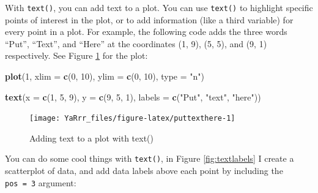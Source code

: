 \documentclass[]{book}
\newenvironment{Shaded}{\begin{snugshade}}{\end{snugshade}}
\newcommand{\KeywordTok}[1]{\textcolor[rgb]{0.13,0.29,0.53}{\textbf{{#1}}}}
\newcommand{\DataTypeTok}[1]{\textcolor[rgb]{0.13,0.29,0.53}{{#1}}}
\newcommand{\DecValTok}[1]{\textcolor[rgb]{0.00,0.00,0.81}{{#1}}}
\newcommand{\StringTok}[1]{\textcolor[rgb]{0.31,0.60,0.02}{{#1}}}
\newcommand{\NormalTok}[1]{{#1}}
\theoremstyle{definition}
\theoremstyle{definition}
\theoremstyle{remark}
\begin{document}
With \texttt{text()}, you can add text to a plot. You can use
\texttt{text()} to highlight specific points of interest in the plot, or
to add information (like a third variable) for every point in a plot.
For example, the following code adds the three words ``Put'', ``Text'',
and ``Here'' at the coordinates (1, 9), (5, 5), and (9, 1) respectively.
See Figure \ref{fig:puttexthere} for the plot:

\begin{Shaded}
\begin{Highlighting}[]
\KeywordTok{plot}\NormalTok{(}\DecValTok{1}\NormalTok{, }
     \DataTypeTok{xlim =} \KeywordTok{c}\NormalTok{(}\DecValTok{0}\NormalTok{, }\DecValTok{10}\NormalTok{), }
     \DataTypeTok{ylim =} \KeywordTok{c}\NormalTok{(}\DecValTok{0}\NormalTok{, }\DecValTok{10}\NormalTok{), }
     \DataTypeTok{type =} \StringTok{"n"}\NormalTok{)}

\KeywordTok{text}\NormalTok{(}\DataTypeTok{x =} \KeywordTok{c}\NormalTok{(}\DecValTok{1}\NormalTok{, }\DecValTok{5}\NormalTok{, }\DecValTok{9}\NormalTok{),}
     \DataTypeTok{y =} \KeywordTok{c}\NormalTok{(}\DecValTok{9}\NormalTok{, }\DecValTok{5}\NormalTok{, }\DecValTok{1}\NormalTok{),}
     \DataTypeTok{labels =} \KeywordTok{c}\NormalTok{(}\StringTok{"Put"}\NormalTok{, }\StringTok{"text"}\NormalTok{, }\StringTok{"here"}\NormalTok{))}
\end{Highlighting}
\end{Shaded}

\begin{figure}

{\centering \texttt{[image: YaRrr\_files/figure-latex/puttexthere-1]} 

}

\caption{Adding text to a plot with text()}\label{fig:puttexthere}
\end{figure}

You can do some cool things with \texttt{text()}, in Figure
\ref{fig:textlabels} I create a scatterplot of data, and add data labels
above each point by including the \texttt{pos\ =\ 3} argument:
\end{document}

